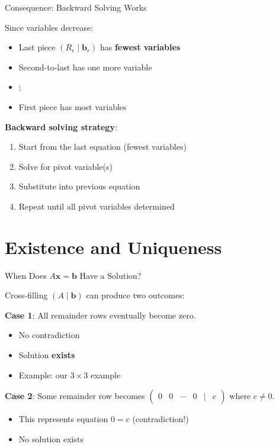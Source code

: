 \documentclass[10pt]{beamer}
\theoremstyle{definition}
\newcommand{\x}[1]{\alert{\textbf{#1}}}
\begin{document}
\begin{frame}{Consequence: Backward Solving Works}

Since variables decrease:

\vspace{1em}

\begin{itemize}
\item Last piece $(R_r \mid \mathbf{b}_r)$ has \x{fewest variables}
\item Second-to-last has one more variable
\item $\vdots$
\item First piece has most variables
\end{itemize}

\vspace{1em}

\x{Backward solving strategy}:
\begin{enumerate}
\item Start from the last equation (fewest variables)
\item Solve for pivot variable(s)
\item Substitute into previous equation
\item Repeat until all pivot variables determined
\end{enumerate}

\end{frame}

\section{Existence and Uniqueness}

\begin{frame}{When Does $A\mathbf{x} = \mathbf{b}$ Have a Solution?}

Cross-filling $(A \mid \mathbf{b})$ can produce two outcomes:

\vspace{1em}

\x{Case 1}: All remainder rows eventually become zero.
\begin{itemize}
\item No contradiction
\item Solution \x{exists}
\item Example: our $3 \times 3$ example
\end{itemize}

\vspace{1em}

\x{Case 2}: Some remainder row becomes $\begin{pmatrix} 0 & 0 & \cdots & 0 & | & c \end{pmatrix}$ where $c \neq 0$.
\begin{itemize}
\item This represents equation $0 = c$ (contradiction!)
\item No solution exists
\end{itemize}

\end{frame}
\end{document}
